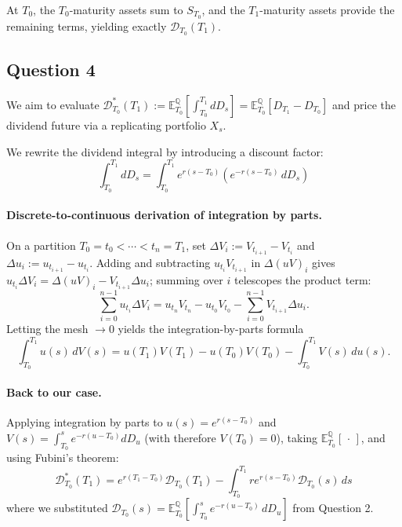 \documentclass[12pt,a4paper]{article}
\begin{document}
At $T_0$, the $T_0$-maturity assets sum to $S_{T_0}$, and the $T_1$-maturity assets provide the remaining terms, yielding exactly $\mathcal{D}_{T_0}(T_1)$.

\subsection*{Question 4}

We aim to evaluate $\mathcal{D}^*_{T_0}(T_1) := \mathbb{E}^\mathbb{Q}_{T_0}\left[ \int_{T_0}^{T_1} dD_s \right] = \mathbb{E}^\mathbb{Q}_{T_0}\left[ D_{T_1} - D_{T_0} \right]$ and price the dividend future via a replicating portfolio $X_s$.

We rewrite the dividend integral by introducing a discount factor:
\begin{equation*}
\int_{T_0}^{T_1} dD_s = \int_{T_0}^{T_1} e^{r(s-T_0)} \left(e^{-r(s-T_0)} \,dD_s\right)
\end{equation*}
\paragraph{Discrete-to-continuous derivation of integration by parts.}
On a partition $T_0 = t_0 < \cdots < t_n = T_1$, set $\Delta V_i := V_{t_{i+1}} - V_{t_i}$ and $\Delta u_i := u_{t_{i+1}} - u_{t_i}$. Adding and subtracting $u_{t_i}V_{t_{i+1}}$ in $\Delta(uV)_i$ gives $u_{t_i}\Delta V_i = \Delta(uV)_i - V_{t_{i+1}}\Delta u_i$; summing over $i$ telescopes the product term:
\[
\sum_{i=0}^{n-1} u_{t_i}\Delta V_i = u_{t_n}V_{t_n} - u_{t_0}V_{t_0} - \sum_{i=0}^{n-1} V_{t_{i+1}}\Delta u_i .
\]
Letting the mesh $\to 0$ yields the integration-by-parts formula
\[
\int_{T_0}^{T_1} u(s)\, dV(s) = u(T_1)V(T_1) - u(T_0)V(T_0) - \int_{T_0}^{T_1} V(s)\, du(s).
\]

\paragraph{Back to our case.}
Applying integration by parts to $u(s) = e^{r(s-T_0)}$ and $V(s) = \int_{T_0}^s e^{-r(u-T_0)}dD_u$ (with therefore $V(T_0) = 0$), taking $\mathbb{E}^\mathbb{Q}_{T_0}[\,\cdot\,]$, and using Fubini's theorem:
\begin{equation}
\mathcal{D}^*_{T_0}(T_1) = e^{r(T_1-T_0)} \mathcal{D}_{T_0}(T_1) - \int_{T_0}^{T_1} r e^{r(s-T_0)} \mathcal{D}_{T_0}(s) \,ds \label{eq:Q4-payoff}
\end{equation}
where we substituted $\mathcal{D}_{T_0}(s) = \mathbb{E}^\mathbb{Q}_{T_0}\left[ \int_{T_0}^{s} e^{-r(u-T_0)} \,dD_u \right]$ from Question 2.
\end{document}
